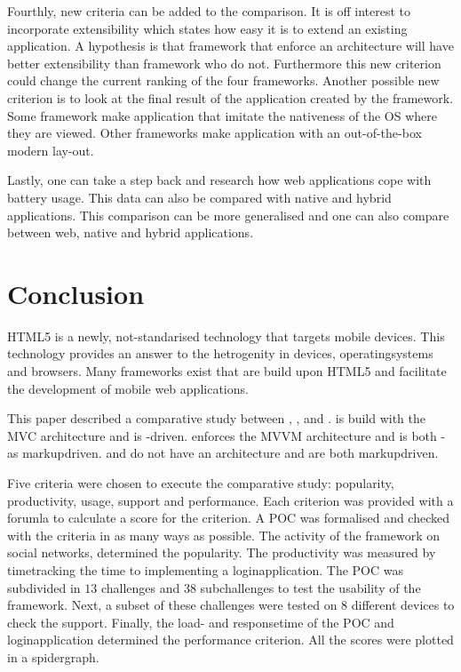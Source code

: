 \documentclass[a4paper]{artikel3}
\begin{document}
Fourthly, new criteria can be added to the comparison.
It is off interest to incorporate extensibility which states how easy it is to extend an existing application.
A hypothesis is that framework that enforce an architecture will have better extensibility than framework who do not.
Furthermore this new criterion could change the current ranking of the four frameworks.
Another possible new criterion is to look at the final result of the application created by the framework.
Some framework make application that imitate the nativeness of the OS where they are viewed.
Other frameworks make application with an out-of-the-box modern lay-out.

Lastly, one can take a step back and research how web applications cope with battery usage.
This data can also be compared with native and hybrid applications.
This comparison can be more generalised and one can also compare between web, native and hybrid applications.


\section{Conclusion} %
\label{sec:conclusion}

HTML5 is a newly,  not-standarised technology that targets mobile devices.
This technology provides an answer to the hetrogenity in devices, operatingsystems and browsers.
Many frameworks exist that are build upon HTML5 and facilitate the development of mobile web applications.

This paper described a comparative study between \sta{},  \kendob{},  \jqma{} and \lungo{}.
\sta{} is build with the MVC architecture and is \js-driven.
\kendob{} enforces the MVVM architecture and is both \js- as markupdriven.
\jqma{} and \lungo{} do not have an architecture and are both markupdriven.

Five criteria were chosen to execute the comparative study:  popularity,  productivity,  usage,  support and performance.
Each criterion was provided with a forumla to calculate a score for the criterion.
A POC was formalised and checked with the criteria in as many ways as possible.
The activity of the framework on social networks, determined the popularity.
The productivity was measured by timetracking the time to implementing a loginapplication.
The POC was subdivided in $13$ challenges and $38$ subchallenges to test the usability of the framework.
Next,  a subset of these challenges were tested on $8$ different devices to check the support.
Finally,  the load- and responsetime of the POC and loginapplication determined the performance criterion.
All the scores were plotted in a spidergraph.
\end{document}
